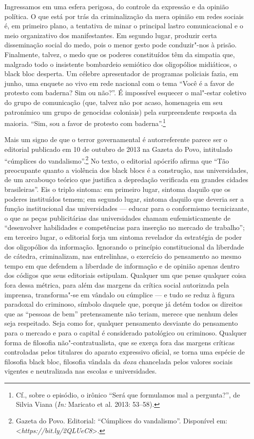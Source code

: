 Ingressamos em uma esfera perigosa, do controle da expressão e da
opinião política. O que está por trás da criminalização da mera opinião
em redes sociais é, em primeiro plano, a tentativa de minar o principal
lastro comunicacional e o meio organizativo dos manifestantes. Em
segundo lugar, produzir certa disseminação social do medo, pois o menor
gesto pode conduzir"-nos à prisão. Finalmente, talvez, o medo que os
poderes constituídos têm da simpatia que, malgrado todo o insistente
bombardeio semiótico dos oligopólios midiáticos, o black bloc desperta.
Um célebre apresentador de programas policiais fazia, em junho, uma
enquete ao vivo em rede nacional com o tema ``Você é a favor de protesto
com baderna? Sim ou não?''. É impossível esquecer o mal"-estar coletivo
do grupo de comunicação (que, talvez não por acaso, homenageia em seu
patronímico um grupo de genocidas coloniais) pela surpreendente resposta
da maioria. ``Sim, sou a favor de protesto com
baderna''.\footnote{Cf., sobre o episódio, o irônico
  ``Será que formulamos mal a pergunta?'', de Silvia Viana (\emph{In:}
  Maricato et al. 2013: 53--58).}

Mais um signo de que o terror governamental é autorreferente parece ser
o editorial publicado em 10 de outubro de 2013 na Gazeta do Povo,
intitulado ``cúmplices do vandalismo''.\footnote{Gazeta
  do Povo. Editorial: ``Cúmplices do vandalismo''. Disponível em:
  \textless{}\emph{https://bit.ly/2QLUeC8}\textgreater{}.}
No texto, o editorial apócrifo afirma que ``Tão preocupante quanto a
violência dos black blocs é a construção, nas universidades, de um
arcabouço teórico que justifica a depredação verificada em grandes
cidades brasileiras''. Eis o triplo sintoma: em primeiro lugar, sintoma
daquilo que os poderes instituídos temem; em segundo lugar, sintoma
daquilo que deveria ser a função institucional das universidades ---
educar para o conformismo tecnicizante, o que as peças publicitárias das
universidades chamam eufemisticamente de ``desenvolver habilidades e
competências para inserção no mercado de trabalho''; em terceiro lugar,
o editorial forja um sintoma revelador da estratégia de poder dos
oligopólios da informação. Ignorando o princípio constitucional da
liberdade de cátedra, criminalizam, nas entrelinhas, o exercício do
pensamento ao mesmo tempo em que defendem a liberdade de informação e de
opinião apenas dentro dos códigos que seus editoriais estipulam.
Qualquer um que pense qualquer coisa fora dessa métrica, para além das
margens da crítica social autorizada pela imprensa, transforma"-se em
vândalo ou cúmplice --- e tudo se reduz à figura paradoxal do criminoso,
símbolo daquele que, porque já detém todos os direitos que as ``pessoas
de bem'' pretensamente não teriam, merece que nenhum deles seja
respeitado. Seja como for, qualquer pensamento desviante do pensamento
para o mercado e para o capital é considerado patológico ou criminoso.
Qualquer forma de filosofia não"-contratualista, que se exerça fora das
margens críticas controladas pelos titulares do aparato expressivo
oficial, se torna uma espécie de filosofia black bloc, filosofia
vândala da \emph{doxa }chancelada pelos valores sociais vigentes e
neutralizada nas escolas e universidades.

